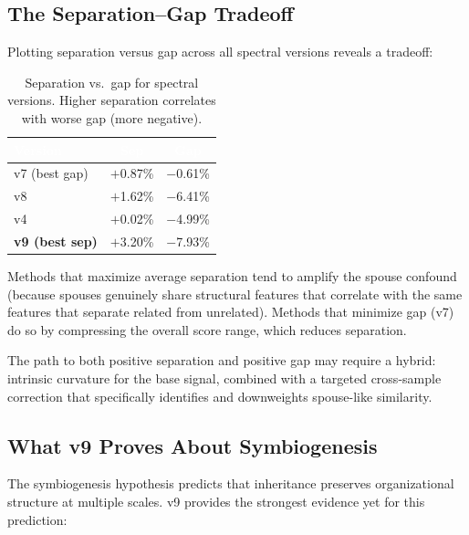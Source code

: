 \documentclass{../yalumba}
\begin{document}
\subsection{The Separation--Gap Tradeoff}

Plotting separation versus gap across all spectral versions reveals a
tradeoff:

\begin{table}[H]
  \centering
  \tablestyle
  \caption{Separation vs.\ gap for spectral versions.  Higher separation
    correlates with worse gap (more negative).}
  \label{tab:tradeoff}
  \begin{tabular}{lcc}
    \toprule
    \rowcolor{table-header}
    \textcolor{white}{\textbf{Version}} &
    \textcolor{white}{\textbf{Sep}} &
    \textcolor{white}{\textbf{Gap}} \\
    \midrule
    v7 (best gap) & $+$0.87\% & $-$0.61\% \\
    v8 & $+$1.62\% & $-$6.41\% \\
    v4 & $+$0.02\% & $-$4.99\% \\
    \textbf{v9 (best sep)} & $+$3.20\% & $-$7.93\% \\
    \bottomrule
  \end{tabular}
\end{table}

Methods that maximize average separation tend to amplify the spouse
confound (because spouses genuinely share structural features that
correlate with the same features that separate related from unrelated).
Methods that minimize gap (v7) do so by compressing the overall score
range, which reduces separation.

The path to both positive separation and positive gap may require a
hybrid: intrinsic curvature for the base signal, combined with a
targeted cross-sample correction that specifically identifies and
downweights spouse-like similarity.

\subsection{What v9 Proves About Symbiogenesis}

The symbiogenesis hypothesis predicts that inheritance preserves
organizational structure at multiple scales.  v9 provides the strongest
evidence yet for this prediction:
\end{document}
